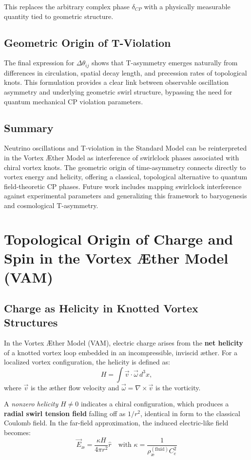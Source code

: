 \documentclass[preprint]{revtex4-2}
\begin{document}
This replaces the arbitrary complex phase \( \delta_{CP} \) with a physically measurable quantity tied to geometric structure.

\subsection{Geometric Origin of T-Violation}

The final expression for \( \Delta \theta_{ij} \) shows that T-asymmetry emerges naturally from differences in circulation, spatial decay length, and precession rates of topological knots. This formulation provides a clear link between observable oscillation asymmetry and underlying geometric swirl structure, bypassing the need for quantum mechanical CP violation parameters.

\subsection{Summary}

Neutrino oscillations and T-violation in the Standard Model can be reinterpreted in the Vortex \AE ther Model as interference of swirlclock phases associated with chiral vortex knots. The geometric origin of time-asymmetry connects directly to vortex energy and helicity, offering a classical, topological alternative to quantum field-theoretic CP phases. Future work includes mapping swirlclock interference against experimental parameters and generalizing this framework to baryogenesis and cosmological T-asymmetry.
\section{Topological Origin of Charge and Spin in the Vortex \AE ther Model (VAM)}

\subsection{Charge as Helicity in Knotted Vortex Structures}

In the Vortex \AE ther Model (VAM), electric charge arises from the \textbf{net helicity} of a knotted vortex loop embedded in an incompressible, inviscid \ae ther. For a localized vortex configuration, the helicity is defined as:
\[
H = \int \vec{v} \cdot \vec{\omega} \, d^3x,
\]
where \( \vec{v} \) is the \ae ther flow velocity and \( \vec{\omega} = \nabla \times \vec{v} \) is the vorticity.

A \emph{nonzero helicity} \( H \neq 0 \) indicates a chiral configuration, which produces a \textbf{radial swirl tension field} falling off as \( 1/r^2 \), identical in form to the classical Coulomb field. In the far-field approximation, the induced electric-like field becomes:
\[
\vec{E}_\text{\ae} = \frac{\kappa H}{4\pi r^2} \hat{r}
\quad \text{with } \kappa = \frac{1}{\rho_\text{\ae}^{(\text{fluid})} C_e^2}
\]
\end{document}
